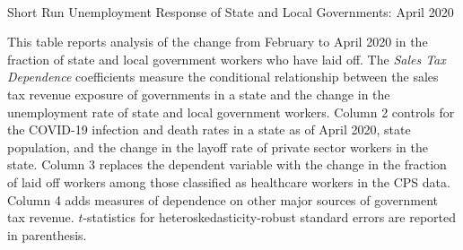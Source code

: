\begin{singlespace}
\begin{center}
\begin{threeparttable}

\caption{\\ Short Run Unemployment Response of State and Local Governments: April 2020}
\label{table:muniLaidoffCovidDiff}

\centering 

\begin{small}

	

\end{small}

\begin{footnotesize}
\begin{tablenotes}
\item This table reports analysis of the change from February to April 2020 in the fraction of state and local government workers who have laid off. The \emph{Sales Tax Dependence} coefficients measure the conditional relationship between the sales tax revenue exposure of governments in a state and the change in the unemployment rate of state and local government workers. Column 2 controls for the COVID-19 infection and death rates in a state as of April 2020, state population, and the change in the layoff rate of private sector workers in the state. Column 3 replaces the dependent variable with the change in the fraction of laid off workers among those classified as healthcare workers in the CPS data. Column 4 adds measures of dependence on other major sources of government tax revenue.   $t$-statistics for heteroskedasticity-robust standard errors are reported in parenthesis. 

\end{tablenotes}
\end{footnotesize}
\end{threeparttable}
\end{center}
\thispagestyle{empty}
\end{singlespace}

